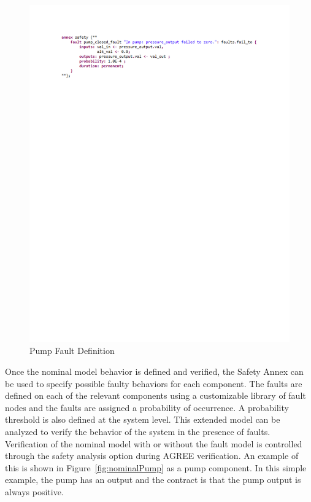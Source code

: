 \begin{figure}[!ht]
	\vspace{-0.4in}
	\begin{center}
		\includegraphics[trim=30 630 0 30,clip,width=1.0\dimexpr\textwidth-1.5cm\relax]{images/pump_fault.pdf}
		\caption{Pump Fault Definition}
		\label{fig:fault_pump}
	\end{center}
\end{figure}

Once the nominal model behavior is defined and verified, the Safety Annex can be used to specify possible faulty behaviors for each component. The faults are defined on each of the relevant components using a customizable library of fault nodes and the faults are assigned a probability of occurrence. A probability threshold is also defined at the system level. This extended model can be analyzed to verify the behavior of the system in the presence of faults. Verification of the nominal model with or without the fault model is controlled through the safety analysis option during AGREE verification. An example of this is shown in Figure~\ref{fig:nominalPump} as a pump component. In this simple example, the pump has an output and the contract is that the pump output is always positive. 

